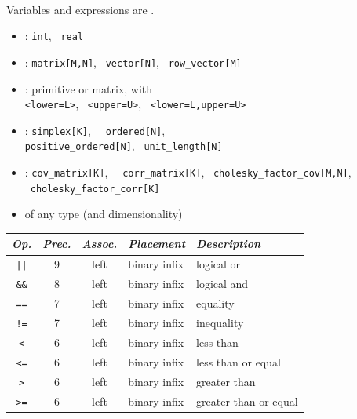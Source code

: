 \documentclass[10pt]{report}
\newcommand{\sld}[1]{\newpage{\noindent\LARGE \ \ \
    \textcolor{MidnightBlue}{\bfseries #1}}\vspace*{4pt}}
\newcommand{\code}[1]{{\tt #1}}
\newcommand{\spc}{\hspace*{0.25in}}
\newcommand{\myemph}[1]{{\color{MidnightBlue}{\bfseries #1}}}
\begin{document}
\sld{Variable and Expression Types}
\\[3pt]
\hspace*{17pt}Variables and expressions are \myemph{strongly, statically typed}.
\begin{itemize}
\item \myemph{Primitive}: {\tt\small int}, \ {\tt\small real}
\item \myemph{Matrix}: {\tt\small matrix[M,N]}, \ {\tt\small vector[N]}, \ {\tt\small row\_vector[M]}
\item \myemph{Bounded}: primitive or matrix, with 
\\ {\tt\small <lower=L>}, \ {\tt\small <upper=U>}, \ {\tt\small <lower=L,upper=U>}
\item \myemph{Constrained Vectors}: {\tt\small simplex[K]}, \ {\tt\small
    ordered[N]},
\\ {\tt\small positive\_ordered[N]}, \ {\tt\small unit\_length[N]}
\item \myemph{Constrained Matrices}: {\tt\small cov\_matrix[K]}, \ {\tt\small
    corr\_matrix[K]}, \ {\tt\small cholesky\_factor\_cov[M,N]}, \
  {\tt\small cholesky\_factor\_corr[K]}
\item \myemph{Arrays:}  of any type (and dimensionality)
\end{itemize}

\sld{Logical Operators}
\vfill
\noindent\spc
{\footnotesize
\begin{tabular}{c|ccl|l}
{\it Op.} & {\it Prec.} & {\it Assoc.} & {\it
  Placement} & {\it Description}
\\ \hline \hline
\code{||} & 9 & left & binary infix & logical or
\\ \hline
\Verb|&&| & 8 & left & binary infix & logical and
\\ \hline
\Verb|==| & 7 & left & binary infix & equality
\\
\Verb|!=| & 7 & left & binary infix & inequality
\\ \hline
\Verb|<| & 6 & left & binary infix & less than
\\
\Verb|<=| & 6 & left & binary infix & less than or equal
\\
\Verb|>| & 6 & left & binary infix & greater than 
\\
\Verb|>=| & 6 & left & binary infix & greater than or equal
\end{tabular}
}
\vfill
\vfill
\end{document}
